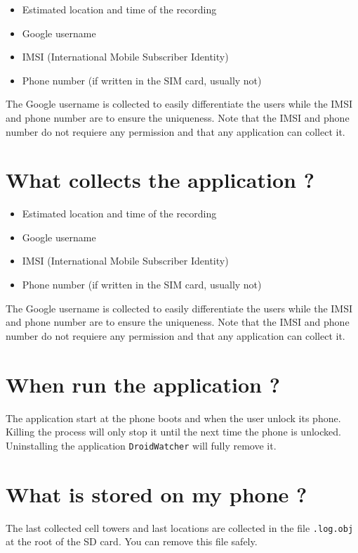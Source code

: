\begin{itemize}
\item Estimated location and time of the recording
\item Google username
\item IMSI (International Mobile Subscriber Identity)
\item Phone number (if written in the SIM card, usually not)
\end{itemize}

The Google username is collected to easily differentiate the users while the IMSI and phone number are to ensure the uniqueness.
Note that the IMSI and phone number do not requiere any permission and that any application can collect it.

\section{What collects the application ?}

\begin{itemize}
\item Estimated location and time of the recording
\item Google username
\item IMSI (International Mobile Subscriber Identity)
\item Phone number (if written in the SIM card, usually not)
\end{itemize}

The Google username is collected to easily differentiate the users while the IMSI and phone number are to ensure the uniqueness.
Note that the IMSI and phone number do not requiere any permission and that any application can collect it.

\section{When run the application ?}

The application start at the phone boots and when the user unlock its phone. Killing the process will only stop it until the next time the phone is unlocked. Uninstalling the application \texttt{DroidWatcher} will fully remove it.

\section{What is stored on my phone ?}

The last collected cell towers and last locations are collected in the file \texttt{.log.obj} at the root of the SD card. You can remove this file safely.

